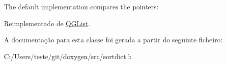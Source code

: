The default implementation compares the pointers\-: 
\begin{DoxyCode}
\end{DoxyCode}
 

Reimplementado de \hyperlink{class_q_g_list_aac689c6d7a54b6558afbd53845183af8}{Q\-G\-List}.



A documentação para esta classe foi gerada a partir do seguinte ficheiro\-:\begin{DoxyCompactItemize}
\item 
C\-:/\-Users/teste/git/doxygen/src/sortdict.\-h\end{DoxyCompactItemize}
